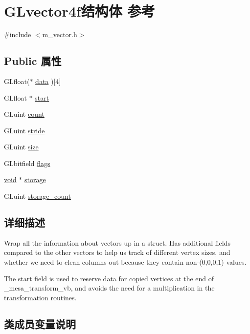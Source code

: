 \hypertarget{struct_g_lvector4f}{}\section{G\+Lvector4f结构体 参考}
\label{struct_g_lvector4f}


{\ttfamily \#include $<$m\+\_\+vector.\+h$>$}

\subsection*{Public 属性}
\begin{DoxyCompactItemize}
\item 
G\+Lfloat($\ast$ \hyperlink{struct_g_lvector4f_ac4496cfda78d106356b73b4cac41761d}{data} )\mbox{[}4\mbox{]}
\item 
G\+Lfloat $\ast$ \hyperlink{struct_g_lvector4f_a37b2bc6b9bda2d1f0bb08485510d0ec4}{start}
\item 
G\+Luint \hyperlink{struct_g_lvector4f_a447eccb061600c93426c8fe30cdc40f6}{count}
\item 
G\+Luint \hyperlink{struct_g_lvector4f_a33ad01f392807d777a925f726cacb97b}{stride}
\item 
G\+Luint \hyperlink{struct_g_lvector4f_ae3421fa4b48cb80b49f81fa5a04fd44f}{size}
\item 
G\+Lbitfield \hyperlink{struct_g_lvector4f_ab10bfdc37b34f053b520f30f13433b08}{flags}
\item 
\hyperlink{interfacevoid}{void} $\ast$ \hyperlink{struct_g_lvector4f_ad9723e4382903415fcc9dea824da1c2c}{storage}
\item 
G\+Luint \hyperlink{struct_g_lvector4f_a16eec0e05b68c2dc7983b0208dd39a52}{storage\+\_\+count}
\end{DoxyCompactItemize}


\subsection{详细描述}
Wrap all the information about vectors up in a struct. Has additional fields compared to the other vectors to help us track of different vertex sizes, and whether we need to clean columns out because they contain non-\/(0,0,0,1) values.

The start field is used to reserve data for copied vertices at the end of \+\_\+mesa\+\_\+transform\+\_\+vb, and avoids the need for a multiplication in the transformation routines. 

\subsection{类成员变量说明}
\mbox{\label{struct_g_lvector4f_a447eccb061600c93426c8fe30cdc40f6}} 
